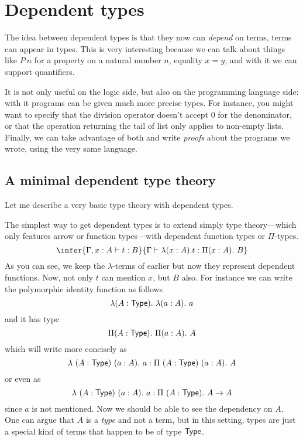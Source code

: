 \chapter{Dependent types}

The idea between dependent types is that they now can \emph{depend} on terms,
\ie terms can appear in types. This is very interesting because we can talk
about things like \(P\ n\) for a property on a natural number \(n\),
equality \(x = y\), and with it we can support quantifiers.

It is not only useful on the logic side, but also on the programming language
side: with it programs can be given much more precise types.
For instance, you might want to specify that the division operator doesn't
accept \(0\) for the denominator, or that the operation returning the tail of
list only applies to non-empty lists.
Finally, we can take advantage of both and write \emph{proofs} about the
programs we wrote, using the very same language.

\section{A minimal dependent type theory}

Let me describe a very basic type theory with dependent types.


The simplest way to get dependent types is to extend simply type theory---which
only features arrow or function types---with dependent function types or
\(\Pi\)-types.
\[
  \infer
    {\Ga, x :A \vdash t : B}
    {\Ga \vdash \lambda (x:A).t : \Pi (x:A).\ B}
\]
As you can see, we keep the \(\lambda\)-terms of earlier but now they represent
dependent functions. Now, not only \(t\) can mention \(x\), but \(B\) also.
For instance we can write the polymorphic identity function as follows
\[
  \lambda (A : \mathsf{Type}).\ \lambda (a : A).\ a
\]
and it has type
\[
  \Pi (A : \mathsf{Type}).\ \Pi (a : A).\ A
\]
which will write more concisely as
\[
  \lambda\ (A : \mathsf{Type})\ (a : A).\ a
  : \Pi\ (A : \mathsf{Type})\ (a : A).\ A
\]
or even as
\[
  \lambda\ (A : \mathsf{Type})\ (a : A).\ a
  : \Pi\ (A : \mathsf{Type}).\ A \to A
\]
since \(a\) is not mentioned.
Now we should be able to see the dependency on \(A\).
One can argue that \(A\) is a \emph{type} and not a term, but in this setting,
types are just a special kind of terms that happen to be of type \(\mathsf{Type}\).

